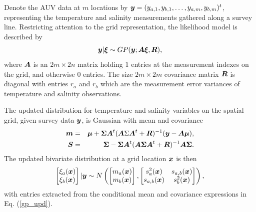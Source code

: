 \documentclass[aoas]{imsart}
\begin{document}
Denote the AUV data at $m$ locations by ${\boldsymbol y}=(y_{a,1},y_{b,1},\ldots,y_{a,m},y_{b,m})^t$, representing the temperature and salinity measurements gathered along a survey line.
Restricting attention to the grid representation, the likelihood model is described by 
\begin{equation}\label{likelihood}
\by | \bxi \sim GP(\by; \bA \bxi,\bR),
\end{equation}
where ${\boldsymbol A}$ is an $2m \times 2n$ matrix holding $1$ entries at the measurement indexes on the grid, and otherwise $0$ entries. The size $2m \times 2m$ covariance matrix ${\boldsymbol R}$ is diagonal with entries $r_a$ and $r_b$ which are the measurement error variances of temperature and salinity observations. 

The updated distribution for temperature and salinity variables on the spatial grid, given survey data ${\boldsymbol y}$, is Gaussian with mean and covariance
\begin{eqnarray}\label{gp_upd}
\bm &=& \bmu+\bSigma \bA^t (\bA \Sigma \bA^t+\bR)^{-1}(\by-\bA \bmu),  \\
\bS &=& \bSigma - \bSigma \bA^t (\bA \bSigma \bA^t+\bR)^{-1} \bA \bSigma.\nonumber
\end{eqnarray}
The updated bivariate distribution at a grid location ${\boldsymbol x}$ is then 
\begin{equation}\label{gp_hat}
\begin{bmatrix}
\xi_a(\bx) \\
\xi_b(\bx)
\end{bmatrix}
 |\by
 \sim N \left( 
\begin{bmatrix} m_{a}(\bx)\\
m_{b}(\bx)
\end{bmatrix},\begin{bmatrix}
s_{a}^2(\bx) & s_{a,b}(\bx)  \\
s_{a,b}(\bx)  & s_{b}^2(\bx)  
\end{bmatrix}
\right),
\end{equation}
with entries extracted from the conditional mean and covariance expressions in Eq. (\ref{gp_upd}).
\end{document}
